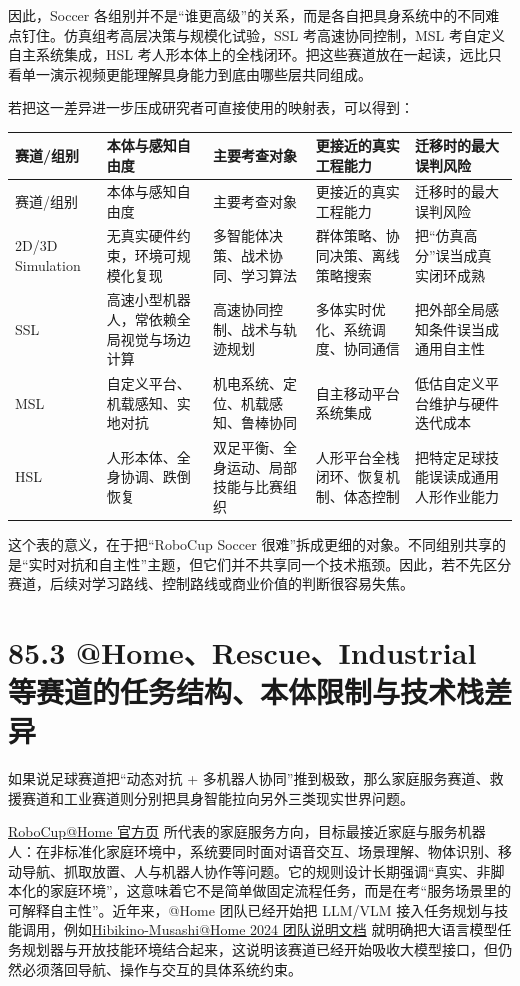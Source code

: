 因此，Soccer 各组别并不是“谁更高级”的关系，而是各自把具身系统中的不同难点钉住。仿真组考高层决策与规模化试验，SSL 考高速协同控制，MSL 考自定义自主系统集成，HSL 考人形本体上的全栈闭环。把这些赛道放在一起读，远比只看单一演示视频更能理解具身能力到底由哪些层共同组成。

若把这一差异进一步压成研究者可直接使用的映射表，可以得到：

\begingroup
\small
\begin{xltabular}{\textwidth}{YYYYY}
\toprule
赛道/组别 & 本体与感知自由度 & 主要考查对象 & 更接近的真实工程能力 & 迁移时的最大误判风险 \\
\midrule
\endfirsthead
\toprule
赛道/组别 & 本体与感知自由度 & 主要考查对象 & 更接近的真实工程能力 & 迁移时的最大误判风险 \\
\midrule
\endhead
2D/3D Simulation & 无真实硬件约束，环境可规模化复现 & 多智能体决策、战术协同、学习算法 & 群体策略、协同决策、离线策略搜索 & 把“仿真高分”误当成真实闭环成熟 \\
SSL & 高速小型机器人，常依赖全局视觉与场边计算 & 高速协同控制、战术与轨迹规划 & 多体实时优化、系统调度、协同通信 & 把外部全局感知条件误当成通用自主性 \\
MSL & 自定义平台、机载感知、实地对抗 & 机电系统、定位、机载感知、鲁棒协同 & 自主移动平台系统集成 & 低估自定义平台维护与硬件迭代成本 \\
HSL & 人形本体、全身协调、跌倒恢复 & 双足平衡、全身运动、局部技能与比赛组织 & 人形平台全栈闭环、恢复机制、体态控制 & 把特定足球技能误读成通用人形作业能力 \\
\bottomrule
\end{xltabular}
\endgroup

这个表的意义，在于把“RoboCup Soccer 很难”拆成更细的对象。不同组别共享的是“实时对抗和自主性”主题，但它们并不共享同一个技术瓶颈。因此，若不先区分赛道，后续对学习路线、控制路线或商业价值的判断很容易失焦。

\section*{85.3 @Home、Rescue、Industrial 等赛道的任务结构、本体限制与技术栈差异}


如果说足球赛道把“动态对抗 + 多机器人协同”推到极致，那么家庭服务赛道、救援赛道和工业赛道则分别把具身智能拉向另外三类现实世界问题。

\href{https://athome.robocup.org/}{RoboCup@Home 官方页} 所代表的家庭服务方向，目标最接近家庭与服务机器人：在非标准化家庭环境中，系统要同时面对语音交互、场景理解、物体识别、移动导航、抓取放置、人与机器人协作等问题。它的规则设计长期强调“真实、非脚本化的家庭环境”，这意味着它不是简单做固定流程任务，而是在考“服务场景里的可解释自主性”。近年来，@Home 团队已经开始把 LLM/VLM 接入任务规划与技能调用，例如\href{https://arxiv.org/abs/2410.06192}{Hibikino-Musashi@Home 2024 团队说明文档} 就明确把大语言模型任务规划器与开放技能环境结合起来，这说明该赛道已经开始吸收大模型接口，但仍然必须落回导航、操作与交互的具体系统约束。

